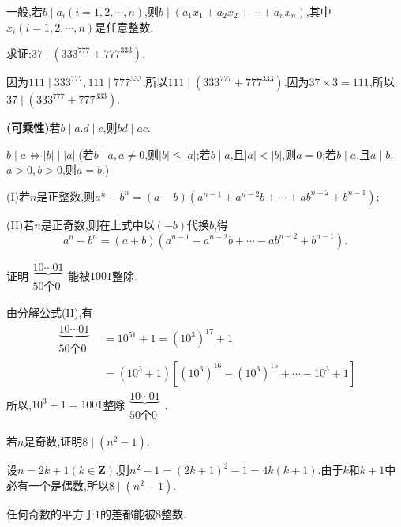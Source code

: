 一般,若$b\mid a_{i}(i=1,2,\cdots,n)$,则$b\mid(a_{1}x_{1}+a_{2}x_{2}+\cdots+a_{n}x_{n})$,其中$x_{i}(i=1,2,\cdots,n)$是任意整数.

\example 求证:$37\mid(333^{777}+777^{333})$.

\proof 因为$111\mid 333^{777},111\mid 777^{333}$,所以$111\mid(333^{777}+777^{333})$.因为$37\times3=111$,所以$37\mid(333^{777}+777^{333})$.

\property \textbf{(可乘性)}若$b\mid a.d\mid c$,则$bd\mid ac$.

\property $b\mid a\Leftrightarrow |b|\mid|a|$.(若$b\mid a,a\neq0$,则$|b|\leqslant|a|$;若$b\mid a$,且$|a|<|b|$,则$a=0$;若$b\mid a$,且$a\mid b$,$a>0,b>0$,则$a=b$.)

\entry (I)若$n$是正整数,则$a^{n}-b^{n}=(a-b)(a^{n-1}+a^{n-2}b+\cdots+ab^{n-2}+b^{n-1})$;

(II)若$n$是正奇数,则在上式中以$(-b)$代换$b$,得
\begin{equation*}
	a^{n}+b^{n}=(a+b)(a^{n-1}-a^{n-2}b+\cdots-ab^{n-2}+b^{n-1}).
\end{equation*}

\example 证明$\begin{matrix} \underbrace{10\cdots01} \\ 50\text{个}0\end{matrix}$能被$1001$整除.

\proof 由分解公式(II),有
\begin{equation*}
	\begin{split}
		\begin{matrix} \underbrace{10\cdots01} \\ 50\text{个}0\end{matrix}&=10^{51}+1=\left(10^{3}\right)^{17}+1\\
		&=\left(10^{3}+1\right)\left[\left(10^{3}\right)^{16}-\left(10^{3}\right)^{15}+\cdots-10^{3}+1\right]
	\end{split}
\end{equation*}
所以,$10^{3}+1=1001$整除$\begin{matrix} \underbrace{10\cdots01} \\ 50\text{个}0\end{matrix}$.

\example 若$n$是奇数,证明$8\mid(n^{2}-1)$.

\proof 设$n=2 k+1(k \in \mathbf{Z})$,则$n^{2}-1=(2 k+1)^{2}-1=4 k(k+1)$.由于$k$和$k+1$中必有一个是偶数,所以$8 \mid\left(n^{2}-1\right)$.
 
\remark {}任何奇数的平方于$1$的差都能被$8$整数.

